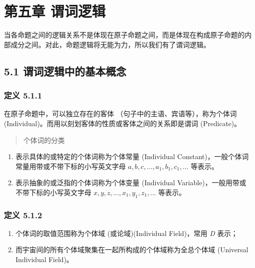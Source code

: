 \section{第五章
谓词逻辑}\label{ux7b2cux4e94ux7ae0-ux8c13ux8bcdux903bux8f91}

当各命题之间的逻辑关系不是体现在原子命题之间，而是体现在构成原子命题的内部成分之间。对此，命题逻辑将无能为力，所以我们有了谓词逻辑。

\subsection{5.1
谓词逻辑中的基本概念}\label{ux8c13ux8bcdux903bux8f91ux4e2dux7684ux57faux672cux6982ux5ff5}

\subsubsection{定义 5.1.1}\label{ux5b9aux4e49-5.1.1}

在原子命题中，可以独立存在的客体 （句子中的主语、宾语等），称为个体词
(Individual)。而用以刻划客体的性质或客体之间的关系即是谓词 (Predicate)。

\begin{quote}
个体词的分类
\end{quote}

\begin{enumerate}
\def\labelenumi{\arabic{enumi}.}
\tightlist
\item
  表示具体的或特定的个体词称为个体常量 (Individual
  Constant)，一般个体词常量用带或不带下标的小写英文字母
  \(a, b, c,…,a_1, b_1, c_1,…\) 等表示。
\item
  表示抽象的或泛指的个体词称为个体变量 (Individual
  Variable)，一般用带或不带下标的小写英文字母
  \(x, y, z, …, x_1, y_1, z_1, …\) 等表示。
\end{enumerate}

\subsubsection{定义 5.1.2}\label{ux5b9aux4e49-5.1.2}

\begin{enumerate}
\def\labelenumi{\arabic{enumi})}
\tightlist
\item
  个体词的取值范围称为个体域 (或论域)(Individual Field)，常用 \emph{D}
  表示；
\item
  而宇宙间的所有个体域聚集在一起所构成的个体域称为全总个体域 (Universal
  Individual Field)。
\end{enumerate}

